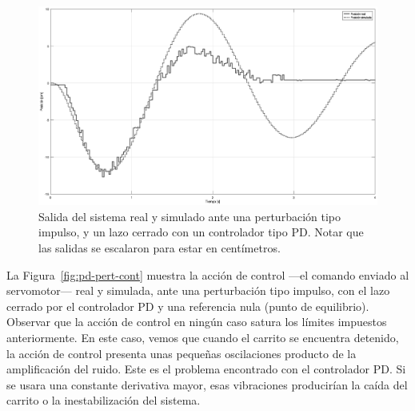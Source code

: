 \begin{figure}[!htbp]
    \centering
    \includegraphics[width=\linewidth]{img/pd-pert-salida.eps}
    \caption{Salida del sistema real y simulado ante una perturbación tipo impulso, y un lazo cerrado con un controlador tipo PD. Notar que las salidas se escalaron para estar en centímetros.}
    \label{fig:pd-pert-salida}
\end{figure}


La Figura~\ref{fig:pd-pert-cont} muestra la acción de control ---el comando enviado al servomotor--- real y simulada, ante una perturbación tipo impulso, con el lazo cerrado por el controlador PD y una referencia nula (punto de equilibrio). Observar que la acción de control en ningún caso satura los límites impuestos anteriormente. En este caso, vemos que cuando el carrito se encuentra detenido, la acción de control presenta unas pequeñas oscilaciones producto de la amplificación del ruido. Este es el problema encontrado con el controlador PD. Si se usara una constante derivativa mayor, esas vibraciones producirían la caída del carrito o la inestabilización del sistema.

